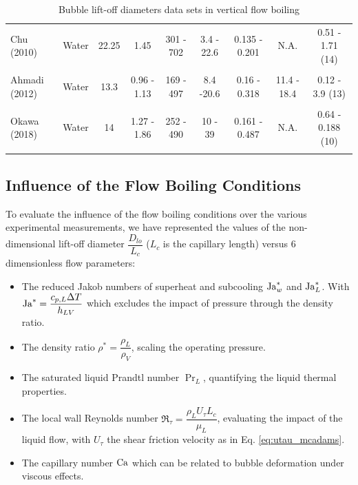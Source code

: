 \begin{table}[h!]
{\begin{tabular}{p{20mm}|c c c c c c c c}
\\
Chu \cite{chu_bubble_2011} \newline (2010) & Water & 22.25 & 1.45 & 301 - 702 & 3.4 - 22.6 & 0.135 - 0.201 &  N.A. & 0.51 - 1.71 (14) \\
\\
Ahmadi \cite{ahmadi_bubble_2012} \newline (2012) & Water & 13.3 & 0.96 - 1.13 & 169 - 497 & 8.4 -20.6 & 0.16 - 0.318 &  11.4 - 18.4 & 0.12 - 3.9 (13) \\
\\
Okawa \cite{okawa_observation_2018} \newline (2018) & Water & 14 & 1.27 - 1.86 & 252 - 490 & 10 - 39 & 0.161 - 0.487 &  N.A. & 0.64 - 0.188 (10) \\
\\
\hline
\end{tabular}
}


\caption{Bubble lift-off diameters data sets in vertical flow boiling}
\label{tab:exp_data_dlo}


\end{table}

\subsection{Influence of the Flow Boiling Conditions}


To evaluate the influence of the flow boiling conditions over the various experimental measurements, we have represented the values of the non-dimensional lift-off diameter $\dfrac{D_{lo}}{L_{c}}$ ($L_{c}$ is the capillary length) versus 6 dimensionless flow parameters:

\begin{itemize}
\item The reduced Jakob numbers of superheat and subcooling $\mathrm{Ja}_{w}^{*}$ and $\mathrm{Ja}_{L}^{*}$. With $\mathrm{Ja}^{*} = \dfrac{c_{p,L}\Delta T}{h_{LV}}$ which excludes the impact of pressure through the density ratio.

\item The density ratio $\rho^{*} = \dfrac{\rho_{L}}{\rho_{V}}$, scaling the operating pressure.

\item The saturated liquid Prandtl number $\Pr_{L}$, quantifying the liquid thermal properties.

\item The local wall Reynolds number $\Re_{\tau} = \dfrac{\rho_{L}U_{\tau}L_{c}}{\mu_{L}}$, evaluating the impact of the liquid flow, with $U_{\tau}$ the shear friction velocity as in Eq. \ref{eq:utau_mcadams}.

\item The capillary number $\mathrm{Ca}$ which can be related to bubble deformation under viscous effects.
\end{itemize}


